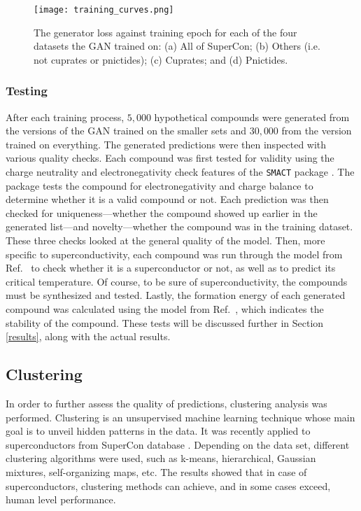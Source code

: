 \begin{figure*}
    \centering
    \texttt{[image: training\_curves.png]}
    \caption{The generator loss against training epoch for each of the four datasets the GAN trained on: (a) All of SuperCon; (b) Others (i.e. not cuprates or pnictides); (c) Cuprates; and (d) Pnictides.}
    \label{fig:training_curves}
\end{figure*}

\subsubsection{Testing}

After each training process, $5,000$ hypothetical compounds were generated from the versions of the GAN trained on the smaller sets and $30,000$ from the version trained on everything. The generated predictions were then inspected with various quality checks. Each compound was first tested for validity using the charge neutrality and electronegativity check features of the \texttt{SMACT} package \cite{DAVIES2016617}. The package tests the compound for electronegativity and charge balance to determine whether it is a valid compound or not. Each prediction was then checked for uniqueness---whether the compound showed up earlier in the generated list---and novelty---whether the compound was in the training dataset. These three checks looked at the general quality of the model. Then, more specific to superconductivity, each compound was run through the model from Ref.~\cite{ROTER20201353689} to check whether it is a superconductor or not, as well as to 
predict its critical temperature. Of course, to be sure of superconductivity, the compounds must be synthesized and tested. Lastly, the formation energy of each generated compound was calculated using the model from Ref.~\cite{Jha2018}, which indicates the stability of the compound. These tests will be discussed further in Section \ref{results}, along with the actual results. 

\subsection{Clustering}

In order to further assess the quality of predictions,
clustering analysis was performed. Clustering is an unsupervised machine learning 
technique whose main goal is to unveil hidden patterns in the data.
It was recently applied to superconductors from SuperCon database \cite{ROTER20221354078}.
Depending on the data set, different clustering algorithms were used, such as k-means, hierarchical, Gaussian mixtures, 
self-organizing maps, etc. The results showed that in case of superconductors, clustering methods can achieve, 
and in some cases exceed, human level performance. 

